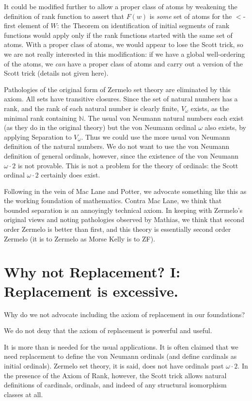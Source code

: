 \documentclass[12pt]{article}
\begin{document}
 It could be modified further to allow a proper class of atoms
by weakening the definition of rank function to assert that $F(w)$ is {\em some\/} set of atoms for the $<$-first element of $W$:  the Theorem on identification of initial segments
of rank functions would apply only if the rank functions started with the same set of atoms.  With a proper class of atoms, we would appear to lose the Scott trick, so we are not really interested in this modification:  if we have a global well-ordering of the atoms, we {\em can\/} have a proper class of atoms and carry out a version of the Scott trick (details not given here).

Pathologies of the original form of Zermelo set theory are eliminated by this axiom.  All sets have transitive closures.  Since the set of natural numbers has a rank, and the rank of each natural number is clearly finite, $V_{\omega}$ exists, as the minimal rank containing $\mathbb N$.  The usual von Neumann natural numbers each exist (as they do in the original theory) but the von Neumann ordinal $\omega$ also exists, by applying Separation to $V_{\omega}$.  Thus we could use the more usual von Neumann definition of the natural numbers.  We do not want to use the von Neumann definition of general ordinals, however, since the existence of the von Neumann $\omega \cdot 2$ is not provable.  This is not a problem for the theory of ordinals:  the Scott ordinal $\omega \cdot 2$ certainly does exist.

Following in the vein of Mac Lane and Potter, we advocate something like this as the working foundation of mathematics.   Contra Mac Lane, we think that bounded separation is an annoyingly technical axiom.  In keeping with Zermelo's original views and noting pathologies observed by Mathias, we think that second order Zermelo is better than first, and this theory is essentially second order Zermelo (it is to Zermelo as Morse Kelly is to ZF).

\section{Why not Replacement? I:  Replacement is excessive.}

Why do we not advocate including the axiom of replacement in our foundations?

We do not deny that the axiom of replacement is powerful and useful.

It is more than is needed for the usual applications.  It is often claimed that we need replacement to define the von Neumann ordinals (and define cardinals as initial ordinals).  Zermelo set theory, it is said, does not have ordinals past $\omega \cdot 2$.  In the presence of the Axiom of Rank, however, the Scott trick allows natural definitions of cardinals, ordinals, and indeed of any structural isomorphism classes at all.
\end{document}

